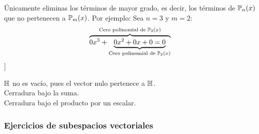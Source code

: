 \begin{enumerate}
\begin{note}
                    Únicamente eliminas los términos de mayor grado, es decir, los términos de $\mathbb{P}_n(x)$ que no pertenecen a $\mathbb{P}_m(x)$. Por ejemplo: Sea $n = 3$ y $m = 2$:
                    \begin{align*}
                        \overbrace{0x^3 + \underbrace{0x^2 + 0x + 0 = 0}_{\text{Cero polinomial de } \mathbb{P}_2(x)}}^{\text{Cero polinomial de } \mathbb{P}_3(x)}
                    \end{align*}
                ]
            \end{note}
        \checkmark $\mathbb{H}$ no es vacío, pues el vector nulo pertenece a $\mathbb{H}$. \\
        \checkmark Cerradura bajo la suma. \\
        \checkmark Cerradura bajo el producto por un escalar.
\end{enumerate}

\subsubsection{Ejercicios de subespacios vectoriales}
\label{sec:ejercicios_de_subespacios_vectoriales}


